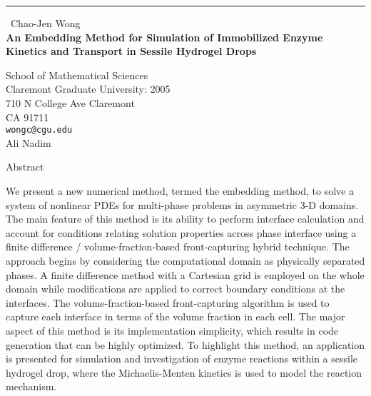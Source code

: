 \documentclass{report}
\begin{document}
\begin{center}
\rule{6in}{1pt} \
{\large Chao-Jen Wong \\
{\bf An Embedding Method for Simulation of Immobilized Enzyme Kinetics and Transport in Sessile Hydrogel Drops }}

School of Mathematical Sciences \\ Claremont Graduate University: 2005 \\ 710 N College Ave Claremont \\ CA 91711
\\
{\tt wongc@cgu.edu}\\
Ali Nadim\end{center}

\baselineskip 1.0pc
\begin{center}
Abstract
\end{center}
We present a new numerical method, termed the embedding method, to solve
a system of nonlinear PDEs for multi-phase problems in asymmetric 3-D
domains. The main feature of this method is its ability to perform
interface calculation and account for conditions relating solution
properties across phase interface using a finite difference /
volume-fraction-based front-capturing hybrid technique. The approach
begins by considering the computational domain as physically separated
phases. A finite difference method with a Cartesian grid is employed on
the whole domain while modifications are applied to correct boundary
conditions at the interfaces. The volume-fraction-based front-capturing
algorithm is used to capture each interface in terms of the volume
fraction in each cell. The major aspect of this method is its
implementation simplicity, which results in code generation that can be
highly optimized. To highlight this method, an application is presented
for simulation and investigation of enzyme reactions within a sessile
hydrogel drop, where the Michaelis-Menten kinetics is used to model the
reaction mechanism.
\end{document}
